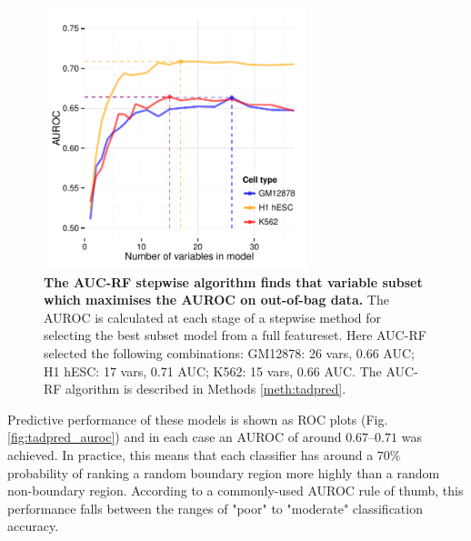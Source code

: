 \documentclass[a4paper,11pt,oneside]{book}
\begin{document}
\begin{figure}
\begin{center} 
\includegraphics[width=3in]{figs/AUCRF_opt.pdf}
\captionsetup{width=\textwidth}
\caption[ The AUC-RF stepwise algorithm finds that variable subset which maximises the AUROC on out-of-bag data. ]{ {\bf The AUC-RF stepwise algorithm finds that variable subset which maximises the AUROC on out-of-bag data. }
The AUROC is calculated at each stage of a stepwise method for selecting the best subset model from a full featureset. Here AUC-RF selected the following combinations: GM12878: 26 vars, 0.66 AUC; H1 hESC: 17 vars, 0.71 AUC; K562: 15 vars, 0.66 AUC. The AUC-RF algorithm is described in Methods \ref{meth:tadpred}.
}\label{fig:tadpred_opt}
\end{center}
\end{figure} 


Predictive performance of these models is shown as ROC plots (Fig. \ref{fig:tadpred_auroc}) and in each case an AUROC of around $0.67$--$0.71$ was achieved. In practice, this means that each classifier has around a $70\%$ probability of ranking a random boundary region more highly than a random non-boundary region.\cite{Fawcett2006a} According to a commonly-used AUROC rule of thumb, this performance falls between the ranges of "poor" to "moderate" classification accuracy.\cite{Streiner2007a}
\end{document}
